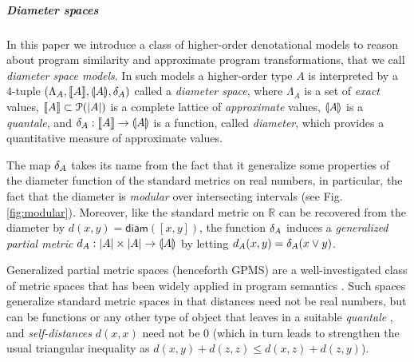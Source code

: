 





\subparagraph*{Diameter spaces}



In this paper we introduce a class of higher-order denotational models to reason about program similarity and approximate program transformations, that we call \emph{diameter space models}.
In such models a higher-order type $A$ is interpreted by a 4-tuple $(\Lambda_A, \llbracket A \rrbracket, \llparenthesis A \rrparenthesis, \delta_{A})$ called a \emph{diameter space}, where $\Lambda_A$ is a set of \emph{exact} values, $\llbracket A \rrbracket\subset \mathcal P(|A|)$ is a complete lattice of \emph{approximate} values, $\llparenthesis A \rrparenthesis$ is a \emph{quantale}, and $\delta_{A}: \llbracket A \rrbracket\to \llparenthesis A \rrparenthesis$ is a function, called \emph{diameter}, which provides a quantitative measure of approximate values.





The map $\delta_{A}$ takes its name from the fact that it  
 generalize some properties of the diameter function of the standard metrics on real numbers, in particular, 
the fact that the diameter is \emph{modular} over intersecting intervals (see Fig. \ref{fig:modular}).
Moreover, like the standard metric on $\mathbb R$ can be recovered from the diameter by $d(x,y)=\mathsf{diam}([x,y])$, the function $\delta_{A}$ induces a \emph{generalized partial metric} $d_{A}:|A|\times |A|\to \llparenthesis A \rrparenthesis$ by letting $d_{A}(x,y)=\delta_{A}(x\vee y)$. 


Generalized partial metric spaces (henceforth GPMS) are a well-investigated class of metric spaces that has been widely applied in program semantics \cite{bkmp:partial-metrics, Bukatin1997, doi:10.1111/j.1749-6632.1994.tb44144.x, Schellekens2004, Samet:2013aa, Stubbe2018, HE201999}. 
Such spaces generalize standard metric spaces in that distances
need not be real numbers, but can be functions or any other type of object that leaves in a suitable \emph{quantale} \cite{Hofmann2014}, and \emph{self-distances} $d(x,x)$ need not be $0$ (which in turn leads to strengthen the usual triangular inequality as $d(x,y) + d(z,z)\leq d(x,z)+d(z,y)$).


